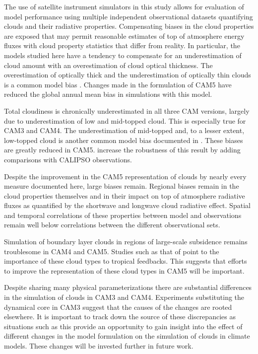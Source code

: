 The use of satellite instrument simulators in this study allows for evaluation of model performance using multiple independent observational datasets quantifying clouds and their radiative properties. Compensating biases in the cloud properties are exposed that may permit reasonable estimates of top of atmosphere energy fluxes with cloud property statistics that differ from reality. In particular, the models studied here have a tendency to compensate for an underestimation of cloud amount with an overestimation of cloud optical thickness. The overestimation of optically thick and the underestimation of optically thin clouds is a common model bias \citep{zhang_et_al_2005}. Changes made in the formulation of CAM5 have reduced the global annual mean bias in simulations with this model.

Total cloudiness is chronically underestimated in all three CAM versions, largely due to underestimation of low and mid-topped cloud. This is especially true for CAM3 and CAM4. The underestimation of mid-topped and, to a lesser extent, low-topped cloud is another common model bias documented in \cite{zhang_et_al_2005}. These biases are greatly reduced in CAM5. \cite{kay_et_al_2011} increase the robustness of this result by adding comparisons with CALIPSO observations.

Despite the improvement in the CAM5 representation of clouds by nearly every measure documented here, large biases remain. Regional biases remain in the cloud properties themselves and in their impact on top of atmosphere radiative fluxes as quantified by the shortwave and longwave cloud radiative effect. Spatial and temporal correlations of these properties between model and observations remain well below correlations between the different observational sets.

Simulation of boundary layer clouds in regions of large-scale subsidence remains troublesome in CAM4 and CAM5. Studies such as that of \cite{bony_and_dufresne_2005} point to the importance of these cloud types to tropical feedbacks. This suggests that efforts to improve the representation of these cloud types in CAM5 will be important.

Despite sharing many physical parameterizations there are substantial differences in the simulation of clouds in CAM3 and CAM4. Experiments substituting the dynamical core in CAM3 suggest that the causes of the changes are rooted elsewhere. It is important to track down the source of these discrepancies as situations such as this provide an opportunity to gain insight into the effect of different changes in the model formulation on the simulation of clouds in climate models. These changes will be invested further in future work.
